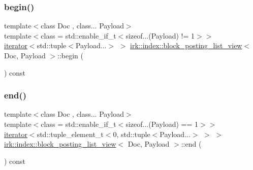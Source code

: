 \mbox{\label{classirk_1_1index_1_1block__posting__list__view_a4b5c29ebc678f45016e27083855d1d96}} 
\subsubsection{\texorpdfstring{begin()}{begin()}\hspace{0.1cm}{\footnotesize\ttfamily [2/2]}}
{\footnotesize\ttfamily template$<$class Doc , class... Payload$>$ \\
template$<$class  = std\+::enable\+\_\+if\+\_\+t$<$sizeof...(\+Payload) != 1$>$$>$ \\
\mbox{\hyperlink{classirk_1_1index_1_1block__posting__list__view_1_1iterator}{iterator}}$<$std\+::tuple$<$Payload...$>$ $>$ \mbox{\hyperlink{classirk_1_1index_1_1block__posting__list__view}{irk\+::index\+::block\+\_\+posting\+\_\+list\+\_\+view}}$<$ Doc, Payload $>$\+::begin (\begin{DoxyParamCaption}{ }\end{DoxyParamCaption}) const\hspace{0.3cm}{\ttfamily [inline]}}

\mbox{\label{classirk_1_1index_1_1block__posting__list__view_a22d74833bc37a7f8e4fd1541663dc40d}} 
\subsubsection{\texorpdfstring{end()}{end()}\hspace{0.1cm}{\footnotesize\ttfamily [1/2]}}
{\footnotesize\ttfamily template$<$class Doc , class... Payload$>$ \\
template$<$class  = std\+::enable\+\_\+if\+\_\+t$<$sizeof...(\+Payload) == 1$>$$>$ \\
\mbox{\hyperlink{classirk_1_1index_1_1block__posting__list__view_1_1iterator}{iterator}}$<$std\+::tuple\+\_\+element\+\_\+t$<$0, std\+::tuple$<$Payload...$>$ $>$ $>$ \mbox{\hyperlink{classirk_1_1index_1_1block__posting__list__view}{irk\+::index\+::block\+\_\+posting\+\_\+list\+\_\+view}}$<$ Doc, Payload $>$\+::end (\begin{DoxyParamCaption}{ }\end{DoxyParamCaption}) const\hspace{0.3cm}{\ttfamily [inline]}}


